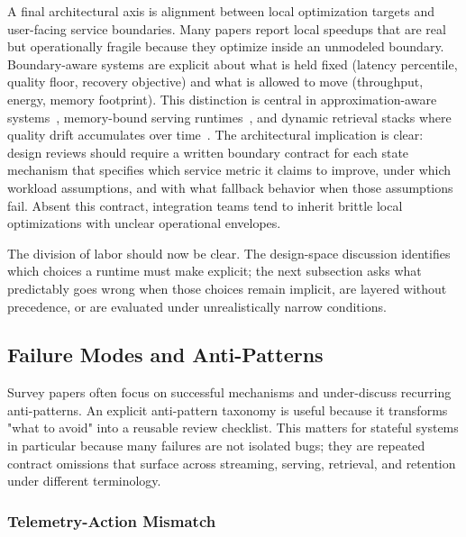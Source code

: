 \documentclass[acmsmall,screen,review]{acmart}
\begin{document}
A final architectural axis is alignment between local optimization targets and user-facing service boundaries. Many papers report local speedups that are real but operationally fragile because they optimize inside an unmodeled boundary. Boundary-aware systems are explicit about what is held fixed (latency percentile, quality floor, recovery objective) and what is allowed to move (throughput, energy, memory footprint). This distinction is central in approximation-aware systems~\cite{zeng2024pecj,zeng2024libamm}, memory-bound serving runtimes~\cite{gujarati2020clockwork,kwon2023pagedattention}, and dynamic retrieval stacks where quality drift accumulates over time~\cite{asai2024selfrag,wang2024hipporag}. The architectural implication is clear: design reviews should require a written boundary contract for each state mechanism that specifies which service metric it claims to improve, under which workload assumptions, and with what fallback behavior when those assumptions fail. Absent this contract, integration teams tend to inherit brittle local optimizations with unclear operational envelopes.

The division of labor should now be clear. The design-space discussion identifies which choices a runtime must make explicit; the next subsection asks what predictably goes wrong when those choices remain implicit, are layered without precedence, or are evaluated under unrealistically narrow conditions.

\subsection{Failure Modes and Anti-Patterns}

Survey papers often focus on successful mechanisms and under-discuss recurring anti-patterns. An explicit anti-pattern taxonomy is useful because it transforms "what to avoid" into a reusable review checklist. This matters for stateful systems in particular because many failures are not isolated bugs; they are repeated contract omissions that surface across streaming, serving, retrieval, and retention under different terminology.

\subsubsection{Telemetry-Action Mismatch}
\end{document}
